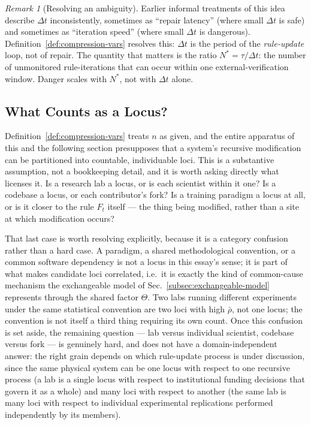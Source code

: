 \documentclass[11pt,a4paper]{article}
\theoremstyle{plain}
\theoremstyle{definition}
\theoremstyle{remark}
\newtheorem{remark}[theorem]{Remark}
\begin{document}
\begin{remark}[Resolving an ambiguity]
\label{rem:resolving-ambiguity}
Earlier informal treatments of this idea describe $\Delta t$ inconsistently, sometimes as ``repair latency'' (where small $\Delta t$ is safe) and sometimes as ``iteration speed'' (where small $\Delta t$ is dangerous). Definition~\ref{def:compression-vars} resolves this: $\Delta t$ is the period of the \emph{rule-update} loop, not of repair. The quantity that matters is the ratio $N^\ast = \tau/\Delta t$: the number of unmonitored rule-iterations that can occur within one external-verification window. Danger scales with $N^\ast$, not with $\Delta t$ alone.
\end{remark}

\subsection{What Counts as a Locus?}
\label{subsec:locus-individuation}

Definition~\ref{def:compression-vars} treats $n$ as given, and the entire apparatus of this and the following section presupposes that a system's recursive modification can be partitioned into countable, individuable loci. This is a substantive assumption, not a bookkeeping detail, and it is worth asking directly what licenses it. Is a research lab a locus, or is each scientist within it one? Is a codebase a locus, or each contributor's fork? Is a training paradigm a locus at all, or is it closer to the rule $F_t$ itself — the thing being modified, rather than a site at which modification occurs?

That last case is worth resolving explicitly, because it is a category confusion rather than a hard case. A paradigm, a shared methodological convention, or a common software dependency is not a locus in this essay's sense; it is part of what makes candidate loci correlated, i.e.\ it is exactly the kind of common-cause mechanism the exchangeable model of Sec.~\ref{subsec:exchangeable-model} represents through the shared factor $\Theta$. Two labs running different experiments under the same statistical convention are two loci with high $\bar\rho$, not one locus; the convention is not itself a third thing requiring its own count. Once this confusion is set aside, the remaining question — lab versus individual scientist, codebase versus fork — is genuinely hard, and does not have a domain-independent answer: the right grain depends on which rule-update process is under discussion, since the same physical system can be one locus with respect to one recursive process (a lab is a single locus with respect to institutional funding decisions that govern it as a whole) and many loci with respect to another (the same lab is many loci with respect to individual experimental replications performed independently by its members).
\end{document}
